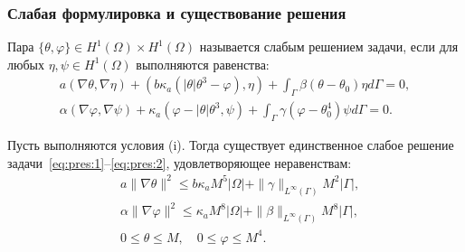 \begin{frame}
    \frametitle{Слабая формулировка и существование решения}
    \begin{definition}
        Пара
        $\{\theta, \varphi\} \in H^1(\Omega) \times H^1(\Omega)$ называется слабым решением задачи,
        если для любых $\eta, \psi \in H^1(\Omega)$ выполняются равенства:
        \begin{gather*}
            a(\nabla \theta, \nabla \eta)
            + \left(b \kappa_{a}\left(|\theta| \theta^{3} - \varphi\right), \eta\right)
            + \int_{\Gamma} \beta\left(\theta - \theta_{0}\right) \eta d \Gamma=0, \\
            \alpha(\nabla \varphi, \nabla \psi)+\kappa_{a}\left(\varphi-|\theta| \theta^{3},
            \psi\right)+\int_{\Gamma} \gamma\left(\varphi-\theta_{0}^{4}\right) \psi d \Gamma=0.
        \end{gather*}
    \end{definition}
    \begin{theorem}[Chebotarev, 2015]
        Пусть выполняются условия (i).
        Тогда существует единственное слабое
        решение задачи~\eqref{eq:pres:1}--\eqref{eq:pres:2},
        удовлетворяющее неравенствам:
        \begin{align}
            & a\|\nabla \theta\|^{2} \leqslant b \kappa_{a} M^{5}|\Omega|
            + \|\gamma\|_{L^{\infty}(\Gamma)} M^{2}|\Gamma|,\\
            & \alpha\|\nabla \varphi\|^{2} \leqslant \kappa_{a} M^{8}|\Omega|
            + \|\beta\|_{L^{\infty}(\Gamma)} M^{8}|\Gamma|,\\
            & 0 \leqslant \theta \leqslant M, \quad 0 \leqslant \varphi \leqslant M^{4}.
        \end{align}
    \end{theorem}
\end{frame}

